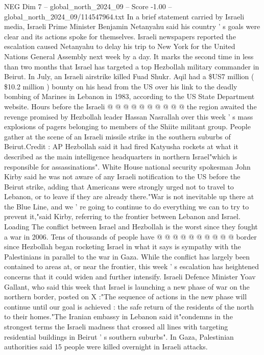 \begin{textsample}{NEG Dim 7 – global\_north\_2024\_09 – Score -1.00 – global\_north\_2024\_09/114547964.txt}
In a brief statement carried by Israeli media, Israeli Prime Minister Benjamin Netanyahu said his country ' s goals were clear and its actions spoke for themselves.
Israeli newspapers reported the escalation caused Netanyahu to delay his trip to New York for the United Nations General Assembly next week by a day.
It marks the second time in less than two months that Israel has targeted a top Hezbollah military commander in Beirut.
In July, an Israeli airstrike killed Fuad Shukr.
Aqil had a \$US7 million ( \$10.2 million ) bounty on his head from the US over his link to the deadly bombing of Marines in Lebanon in 1983, according to the US State Department website.
Hours before the Israeli @ @ @ @ @ @ @ @ @ @ the region awaited the revenge promised by Hezbollah leader Hassan Nasrallah over this week ' s mass explosions of pagers belonging to members of the Shiite militant group.
People gather at the scene of an Israeli missile strike in the southern suburbs of Beirut.Credit : AP Hezbollah said it had fired Katyusha rockets at what it described as the main intelligence headquarters in northern Israel"which is responsible for assassinations".
White House national security spokesman John Kirby said he was not aware of any Israeli notification to the US before the Beirut strike, adding that Americans were strongly urged not to travel to Lebanon, or to leave if they are already there."War is not inevitable up there at the Blue Line, and we ' re going to continue to do everything we can to try to prevent it,"said Kirby, referring to the frontier between Lebanon and Israel.
Loading The conflict between Israel and Hezbollah is the worst since they fought a war in 2006.
Tens of thousands of people have @ @ @ @ @ @ @ @ @ @ border since Hezbollah began rocketing Israel in what it says is sympathy with the Palestinians in parallel to the war in Gaza.
While the conflict has largely been contained to areas at, or near the frontier, this week ' s escalation has heightened concerns that it could widen and further intensify.
Israeli Defence Minister Yoav Gallant, who said this week that Israel is launching a new phase of war on the northern border, posted on X :"The sequence of actions in the new phase will continue until our goal is achieved : the safe return of the residents of the north to their homes."The Iranian embassy in Lebanon said it"condemns in the strongest terms the Israeli madness that crossed all lines with targeting residential buildings in Beirut ' s southern suburbs".
In Gaza, Palestinian authorities said 15 people were killed overnight in Israeli attacks.

\end{textsample}
